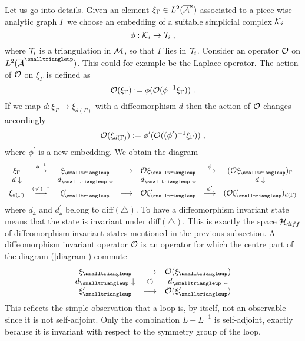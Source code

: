 \documentclass[12pt]{article}
\newcommand{\ba}{\begin{eqnarray}}
\newcommand{\ea}{\end{eqnarray}}
\def\G{\Gamma}
\def\ca{{\cal A}}
\def\ch{{\cal H}}
\def\ck{{\cal K}}
\def\cm{{\cal M}}
\def\co{{\cal O}}
\def\ct{{\cal T}}
\begin{document}
\begin{appendix}
Let us go into details. Given an element $\xi_\G\in L^2(\overline{\ca}^{\small a})$ associated to a piece-wise analytic graph $\G$ we choose an embedding of a suitable simplicial complex $\ck_i$
\[
\phi:\ck_i\rightarrow\ct_i\;,
\]
where $\ct_i$ is a triangulation in $\cm$,
so that $\G$ lies in $\ct_i$. Consider an operator $\co$ on $L^2(\overline{\ca}^{\smalltriangleup})$. This could for example be the Laplace operator. The action of $\co$ on $\xi_\G$ is defined as 
\[
\co(\xi_\G):= \phi(\co(\phi^{-1}\xi_\G))\;.
\]
If we map $d:\xi_\G\rightarrow\xi_{d(\G)}$ with a diffeomorphism $d$
then the action of $\co$ changes accordingly
\[
\co(\xi_{d(\G)}):= \phi^{\prime}(\co((\phi^{\prime})^{-1}\xi_\G))\;,
\]
where $\phi^{\prime}$ is a new embedding. We obtain the diagram 
\ba
\begin{array}{ccccccc}
\xi_\G &\stackrel{\phi^{-1}}{\longrightarrow} & \xi_{\smalltriangleup}&  \longrightarrow  &   \co\xi_{\smalltriangleup} & \stackrel{\phi}{\longrightarrow} & (\co\xi_{\smalltriangleup})_{\G}\\
d\downarrow && d_{\smalltriangleup}\downarrow && d_{\smalltriangleup}\downarrow && d\downarrow  \\
\xi_{d(\G)} &\stackrel{(\phi^{\prime})^{-1}}{\longrightarrow} & \xi^{\prime}_{\smalltriangleup}&  \longrightarrow  &   \co\xi^{\prime}_{\smalltriangleup} & \stackrel{\phi^{\prime}}{\longrightarrow} & (\co\xi^{\prime}_{\smalltriangleup})_{d(\G)}
\end{array}
\label{diagram}
\ea
where $d_{\smalltriangleup}$ and $d^\prime_{\smalltriangleup}$ belong to diff$(\triangle)$. To have a diffeomorphism invariant state means that the state is invariant under diff$(\triangle)$. This is exactly the space $\ch_{diff}$ of diffeomorphism invariant states mentioned in the previous subsection. A diffeomorphism invariant operator $\co$ is an operator for which the centre part of the diagram (\ref{diagram}) commute
\[
\begin{array}{ccc}
 \xi_{\smalltriangleup}&  \longrightarrow  &   \co ( \xi_{\smalltriangleup}) \\
 d_{\smalltriangleup}\downarrow & \circlearrowleft   & d_{\smalltriangleup}\downarrow  \\
 \xi^{\prime}_{\smalltriangleup}&  \longrightarrow  &   \co (\xi^{\prime}_{\smalltriangleup}) 
\end{array}
\]
This reflects the simple observation that a loop is, by itself, not an observable since it is not self-adjoint. Only the combination $L + L^{-1}$ is self-adjoint, exactly because it is invariant with respect to the symmetry group of the loop.






\end{appendix}
\end{document}
